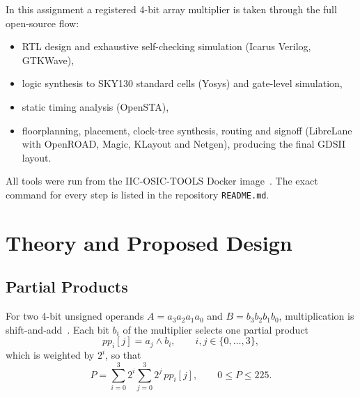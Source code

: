 \documentclass[conference]{IEEEtran}
\begin{document}
In this assignment a registered 4-bit array multiplier is taken through the full open-source flow:
\begin{itemize}
    \item RTL design and exhaustive self-checking simulation (Icarus Verilog, GTKWave),
    \item logic synthesis to SKY130 standard cells (Yosys) and gate-level simulation,
    \item static timing analysis (OpenSTA),
    \item floorplanning, placement, clock-tree synthesis, routing and signoff (LibreLane with OpenROAD,
          Magic, KLayout and Netgen), producing the final GDSII layout.
\end{itemize}
All tools were run from the IIC-OSIC-TOOLS Docker image~\cite{iic}. The exact command for every step is
listed in the repository \texttt{README.md}.

\section{Theory and Proposed Design}

\subsection{Partial Products}
For two 4-bit unsigned operands $A=a_3a_2a_1a_0$ and $B=b_3b_2b_1b_0$, multiplication is
shift-and-add~\cite{weste,rabaey}.
Each bit $b_i$ of the multiplier selects one partial product
\begin{equation}
pp_i[j] = a_j \wedge b_i, \qquad i,j \in \{0,\dots,3\},
\end{equation}
which is weighted by $2^i$, so that
\begin{equation}
P = \sum_{i=0}^{3} 2^{i} \sum_{j=0}^{3} 2^{j}\, pp_i[j], \qquad 0 \le P \le 225 .
\end{equation}
\end{document}
